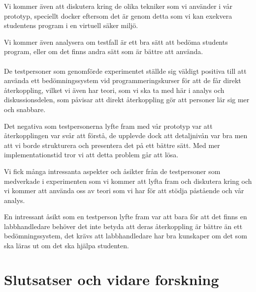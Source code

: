 \documentclass[a4paper,11pt]{article}
\begin{document}
{Vi kommer även att diskutera kring de olika tekniker som vi använder i vår prototyp, speciellt docker eftersom det är genom detta som vi kan exekvera studentens program i en virtuell säker miljö.

Vi kommer även analysera om testfall är ett bra sätt att bedöma students program, eller om det finns andra sätt som är bättre att använda.
\\
\\
De testpersoner som genomförde experimentet ställde sig väldigt positiva till att använda ett bedömningssystem vid programmeringskurser för att de får direkt återkoppling, vilket vi även har teori, som vi ska ta med här i analys och diskussionsdelen, som påvisar att direkt återkoppling gör att personer lär sig mer och snabbare.

Det negativa som testpersonerna lyfte fram med vår prototyp var att återkopplingen var svår att förstå, de upplevde dock att detaljnivån var bra men att vi borde strukturera och presentera det på ett bättre sätt. Med mer implementationstid tror vi att detta problem går att lösa.

Vi fick många intressanta aspekter och åsikter från de testpersoner som medverkade i experimenten som vi kommer att lyfta fram och diskutera kring och vi kommer att använda oss av teori som vi har för att stödja påstående och vår analys.

En intressant åsikt som en testperson lyfte fram var att bara för att det finns en labbhandledare behöver det inte betyda att deras återkoppling är bättre än ett bedömningssystem, det krävs att labbhandledare har bra kunskaper om det som ska läras ut om det ska hjälpa studenten.

\newpage
\section{Slutsatser och vidare forskning}


%
\newpage
{}




\newpage




}
\end{document}
